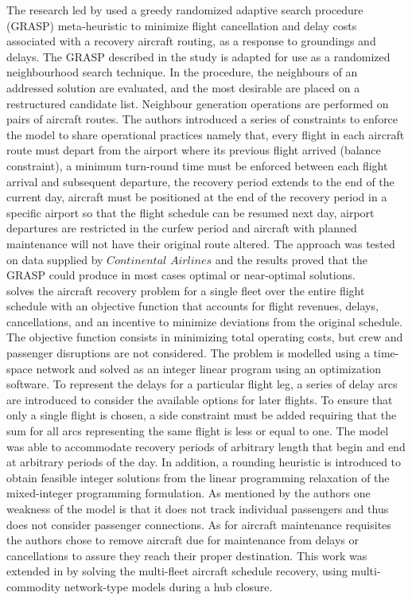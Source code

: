 \documentclass[ijoo,nonblindrev]{informs-ijoo}
\begin{document}
The research led by \citep{Arguello1997} used a greedy randomized adaptive search procedure (GRASP) meta-heuristic to minimize flight cancellation and delay costs associated with a recovery aircraft routing, as a response to groundings and delays. The GRASP described in the study is adapted for use as a randomized neighbourhood search technique. In the procedure, the neighbours of an addressed solution are evaluated, and the most desirable are placed on a restructured candidate list. Neighbour generation operations are performed on pairs of aircraft routes. The authors introduced a series of constraints to enforce the model to share operational practices namely that, every flight in each aircraft route must depart from the airport where its previous flight arrived (balance constraint), a minimum turn-round time must be enforced between each flight arrival and subsequent departure, the recovery period extends to the end of the current day, aircraft must be positioned at the end of the recovery period in a specific airport so that the flight schedule can be resumed next day, airport departures are restricted in the curfew period and aircraft with planned maintenance will not have their original route altered. The approach was tested on data supplied by $Continental$ $Airlines$ and the results proved that the GRASP could produce in  most cases optimal or near-optimal solutions.\\
\citep{THENGVALL2000} solves the aircraft recovery problem for a single fleet over the entire flight schedule with an objective function that accounts for flight revenues, delays, cancellations, and an incentive to minimize deviations from the original schedule. The objective function consists in minimizing total operating costs, but crew and passenger disruptions are not considered. The problem is modelled using a time-space network and solved as an integer linear program using an optimization software.  To  represent the delays for a particular flight leg, a series  of delay arcs are introduced to consider the available options for later flights.  To  ensure   that only a single flight is chosen, a side constraint must be added requiring that the sum   for all arcs representing the same flight is less or equal to one. The model was able to accommodate recovery periods of arbitrary length that begin and end at arbitrary periods of the day. In addition, a rounding heuristic is introduced to obtain feasible integer solutions from the linear programming relaxation of the mixed-integer programming formulation. As mentioned by the authors one weakness of the model is that it does not track individual passengers and thus does not consider passenger connections. As for aircraft maintenance requisites the authors chose to remove aircraft due for maintenance from delays or cancellations to assure they reach their proper destination. This work was extended in \citep{Thengvall2001} by solving the multi-fleet aircraft schedule recovery, using multi-commodity network-type models during a hub closure.\\
\end{document}
